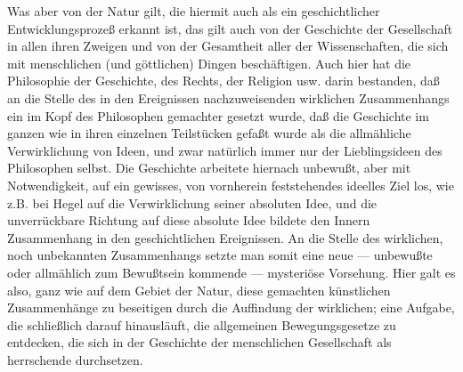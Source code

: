 Was aber von der Natur gilt, die hiermit auch als ein
geschichtlicher Entwicklungsprozeß
erkannt ist, das gilt auch von der Geschichte der Gesellschaft in allen
ihren Zweigen und von der Gesamtheit aller der Wissenschaften, die sich
mit menschlichen (und göttlichen) Dingen beschäftigen. Auch hier hat die
Philosophie der Geschichte, des Rechts, der Religion usw. darin
bestanden, daß an die Stelle des in den Ereignissen nachzuweisenden
wirklichen Zusammenhangs ein im Kopf des Philosophen gemachter gesetzt
wurde, daß die Geschichte im ganzen wie in ihren einzelnen Teilstücken
gefaßt wurde als die allmähliche Verwirklichung von Ideen, und zwar
natürlich immer nur der Lieblingsideen des Philosophen selbst. Die
Geschichte arbeitete hiernach unbewußt, aber mit Notwendigkeit, auf ein
gewisses, von vornherein feststehendes ideelles Ziel los, wie z.B. bei
Hegel auf die Verwirklichung seiner absoluten Idee, und die
unverrückbare Richtung auf diese absolute Idee bildete den Innern
Zusammenhang in den geschichtlichen Ereignissen. An die Stelle des
wirklichen, noch unbekannten Zusammenhangs setzte man somit eine neue ---
unbewußte oder allmählich zum Bewußtsein kommende --- mysteriöse
Vorsehung. Hier galt es also, ganz wie auf dem Gebiet der Natur, diese
gemachten künstlichen Zusammenhänge zu beseitigen durch die Auffindung
der wirklichen; eine Aufgabe, die schließlich darauf hinausläuft, die
allgemeinen Bewegungsgesetze zu entdecken, die sich in der Geschichte
der menschlichen Gesellschaft als herrschende durchsetzen.

